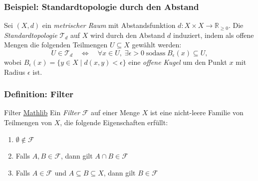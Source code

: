 \documentclass{beamer}
\begin{document}
\begin{frame}
    \frametitle{Beispiel: Standardtopologie durch den Abstand}
    Sei $(X, d)$ ein \emph{metrischer Raum} mit Abstandsfunktion $d: X \times X \rightarrow \mathbb{R}_{\geq 0}$.
    Die \emph{Standardtopologie} $\mathcal{T}_d$ auf $X$ wird durch den Abstand $d$ induziert, indem als offene Mengen die folgenden Teilmengen $U \subseteq X$ gewählt werden:
    \[
    U \in \mathcal{T}_d \quad \Leftrightarrow \quad \forall x \in U, \; \exists \epsilon > 0 \; \text{sodass} \; B_\epsilon(x) \subseteq U,
    \]
    wobei $B_\epsilon(x) = \{ y \in X \mid d(x, y) < \epsilon \}$ eine \emph{offene Kugel} um den Punkt $x$ mit Radius $\epsilon$ ist.
\end{frame}




\begin{frame}
    \frametitle{Definition: Filter }
    \begin{block}{Filter \href{https://github.com/leanprover-community/mathlib4/blob/418a5eb7aec3fb639097cb13f74fc031ac4057f2/Mathlib/Order/Filter/Defs.lean\#L62-L70}{Mathlib}}
    Ein \emph{Filter} $\mathcal{F}$ auf einer Menge $X$ ist eine nicht-leere Familie von Teilmengen von $X$, die folgende Eigenschaften erfüllt:
    \begin{enumerate}
        \item $\emptyset \notin \mathcal{F}$
        \item Falls $A, B \in \mathcal{F}$, dann gilt $A \cap B \in \mathcal{F}$
        \item Falls $A \in \mathcal{F}$ und $A \subseteq B \subseteq X$, dann gilt $B \in \mathcal{F}$
    \end{enumerate}
    \end{block}
\end{frame}
\end{document}
